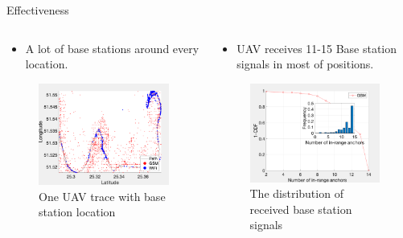 \documentclass[aspectratio=169, 8pt]{beamer}
\begin{document}
\begin{frame}{Effectiveness}


\begin{columns}[T]
    \begin{column}{0.5\linewidth}
    
      \begin{itemize}
               
                \item A lot of base stations around every location.
            \end{itemize}

        \begin{figure}
            \centering
            \includegraphics[width = 0.7 \textwidth]{images/path_gsm.png}
            \caption{One UAV trace with base station location}
            \label{fig:path_gsm}
        \end{figure}
    \end{column}

    \begin{column}{0.5\linewidth}
\begin{itemize}
                \item UAV receives 11-15 Base station signals in most of positions.
               
            \end{itemize}


    \begin{figure}
            \centering
            \includegraphics[width = 0.7 \textwidth]{images/num_bs.png}
            \caption{The distribution of received base station signals}
            \label{fig:num_bs}
        \end{figure}
    \end{column}
\end{columns}




\end{frame}
\end{document}
